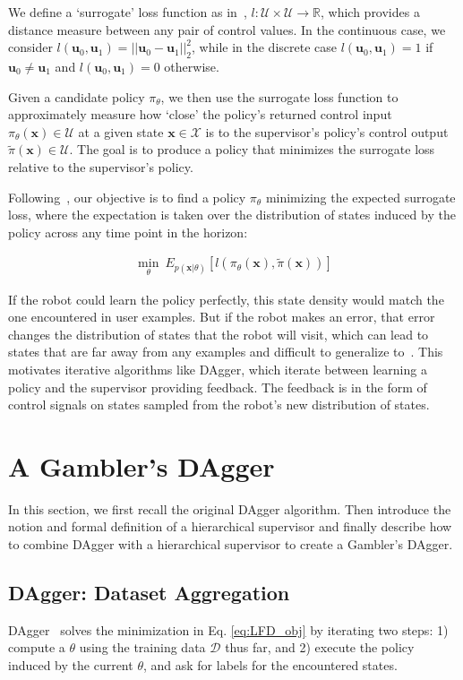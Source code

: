 \documentclass[10pt, conference]{ieeeconf}      %
\newcommand{\bu}{\mathbf{u}}
\newcommand{\bx}{\mathbf{x}}
\begin{document}
We define a `surrogate' loss function as in~\cite{ross2010reduction}, $l:\mathcal{U}\times \mathcal{U}\to \mathbb{R}$, which provides a distance
measure between any pair of control values. In the continuous case, we consider $l(\bu_0,\bu_1) = ||\bu_0-\bu_1||^2_2$,
while in the discrete case $l(\bu_0,\bu_1) = 1$ if $\bu_0 \neq \bu_1$ and $l(\bu_0, \bu_1)=0$ otherwise.

Given a candidate policy $\pi_{\theta}$, we then use the surrogate loss function to approximately measure how `close' the policy's
returned control input $\pi_{\theta}(\bx)\in \mathcal{U}$ at a given state $\bx\in \mathcal{X}$ is to the supervisor's policy's control output
$\tilde{\pi}(\bx)\in \mathcal{U}$. The goal is to produce a policy that minimizes the surrogate loss relative to the supervisor's policy.


Following~\cite{ross2010reduction}, our objective is to find a policy $\pi_{\theta}$ minimizing the expected surrogate loss, where the expectation is taken over the distribution of states induced by the policy across any time point in the horizon:

 \vspace{-2ex}
\begin{align}\label{eq:LFD_obj}
\underset{\theta}{\min} \: E_{p(\bx|\theta)} [l(\pi_\theta(\bx),\tilde{\pi}(\bx))]
\end{align}

 If the robot could learn the policy  perfectly, this state density would match the one encountered in user examples. But if the robot makes an error, that error changes the distribution of states that the robot will visit, which can lead to states that are far away from any examples and difficult to generalize to~\cite{pomerleau1989alvinn}. This motivates iterative algorithms like DAgger, which iterate between learning a policy and the supervisor providing feedback. The feedback is in the form of control signals on states sampled from the robot's new distribution of states. 
 
 \section{A Gambler's DAgger}
 In this section, we first recall the original DAgger algorithm. Then introduce the notion and formal definition of a hierarchical supervisor and finally describe how to combine DAgger with a hierarchical supervisor to create a Gambler's DAgger. 
 
 \subsection{DAgger: Dataset Aggregation}
 DAgger~\cite{ross2010reduction} solves the minimization in Eq. \ref{eq:LFD_obj} by iterating two steps: 1) compute a $\theta$ using the training data $\mathcal{D}$ thus far, and 2) execute the policy induced by the current $\theta$, and ask for labels for the encountered states. 
\end{document}
